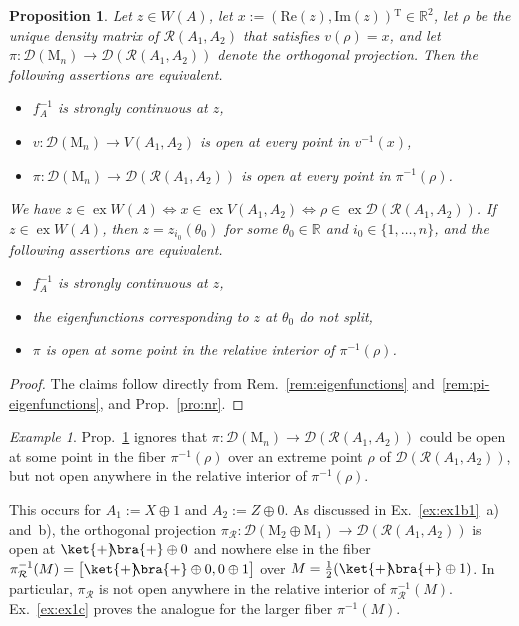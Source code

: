 \documentclass[a4paper,11pt,reqno]{amsart}
\newcommand{\R}{\mathbb{R}}
\newcommand{\M}{\mathrm{M}}
\newcommand{\cD}{\mathcal{D}}
\newcommand{\cR}{\mathcal{R}}
\renewcommand\Im{\mathrm{Im}}
\renewcommand\Re{\mathrm{Re}}
\newcommand{\tp}{{}^\mathrm{T}}
\DeclareMathOperator\ex{ex}
\newtheorem{prop}[thm]{Proposition}
\theoremstyle{definition}
\theoremstyle{remark}
\newtheorem{exa}[thm]{Example}
\numberwithin{equation}{section}
\begin{document}
\begin{prop}\label{pro:DR-eigenfunctions}
Let $z\in W(A)$, let $x:=(\Re(z),\Im(z))\tp\in\R^2$, let $\rho$ be 
the unique density matrix of $\cR(A_1,A_2)$ that satisfies $v(\rho)=x$,
and let $\pi:\cD(\M_n)\to\cD(\cR(A_1,A_2))$ denote the orthogonal 
projection. Then the following assertions are equivalent.
\begin{itemize}
\item
$f_A^{-1}$ is strongly continuous at $z$,
\item
$v:\cD(\M_n)\to V(A_1,A_2)$ is open at every point in $v^{-1}(x)$, 
\item
$\pi:\cD(\M_n)\to\cD(\cR(A_1,A_2))$ is open at every point in $\pi^{-1}(\rho)$.
\end{itemize}
We have 
$z\in\ex W(A)\Leftrightarrow x\in\ex V(A_1,A_2)
\Leftrightarrow \rho\in\ex\cD(\cR(A_1,A_2))$. If $z\in\ex W(A)$, then
$z=z_{i_0}(\theta_0)$ for some $\theta_0\in\R$ and $i_0\in\{1,\ldots,n\}$,
and the following assertions are equivalent.
\begin{itemize}
\item
$f_A^{-1}$ is strongly continuous at $z$,
\item
the eigenfunctions corresponding to $z$ at $\theta_0$ do not split,
\item
$\pi$ is open at some point in the relative interior of $\pi^{-1}(\rho)$.
\end{itemize}
\end{prop}
%
\begin{proof}
The claims follow directly from Rem.~\ref{rem:eigenfunctions} 
and~\ref{rem:pi-eigenfunctions}, and Prop.~\ref{pro:nr}.
\end{proof}
%
\begin{exa}\label{ex:riM2M1}
Prop.~\ref{pro:DR-eigenfunctions} ignores that $\pi:\cD(\M_n)\to\cD(\cR(A_1,A_2))$ 
could be open at some point in the fiber $\pi^{-1}(\rho)$ over an extreme point 
$\rho$ of $\cD(\cR(A_1,A_2))$, but not open anywhere in the relative interior of 
$\pi^{-1}(\rho)$.
\par
%
This occurs for $A_1:=X\oplus 1$ and $A_2:=Z\oplus 0$. As discussed in 
Ex.~\ref{ex:ex1b1}~a) and~b), the orthogonal projection 
$\pi_\cR:\cD(\M_2\oplus\M_1)\to\cD(\cR(A_1,A_2))$ is open at 
$\ket{+}\!\!\bra{+}\oplus0$ and nowhere else in the fiber 
$\pi_\cR^{-1}(M)=\big[\ket{+}\!\!\bra{+}\oplus0,0\oplus 1\big]$ over 
$M=\frac{1}{2}(\ket{+}\!\!\bra{+}\oplus 1)$. In particular, $\pi_\cR$ is not 
open anywhere in the relative interior of $\pi_\cR^{-1}(M)$. Ex.~\ref{ex:ex1c} 
proves the analogue for the larger fiber $\pi^{-1}(M)$.
\end{exa}
%
%
\end{document}
